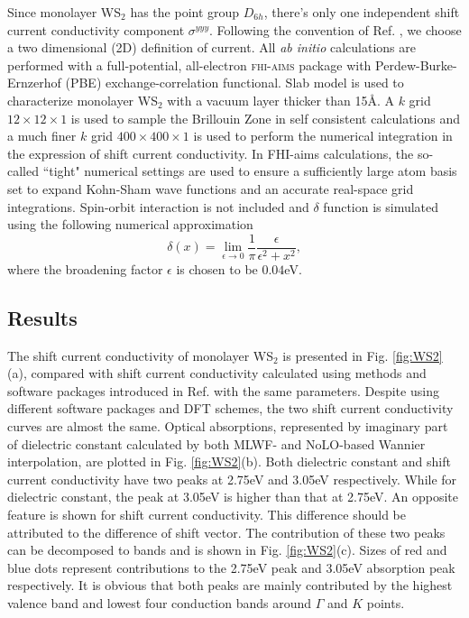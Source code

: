 Since monolayer WS$_2$ has the point group $D_{6h}$, there's only one independent shift current conductivity component $\sigma^{yyy}$\cite{bilbao,wang_first-principles_2017}. Following the convention of Ref. , we choose a two dimensional (2D) definition of current. All \emph{ab initio} calculations are performed with a full-potential, all-electron \textsc{fhi-aims} package\cite{blum_ab_2009} with Perdew-Burke-Ernzerhof (PBE) exchange-correlation functional\cite{perdew_generalized_1996}. Slab model is used to characterize monolayer WS$_2$ with a vacuum layer thicker than 15\AA. A $k$ grid $12\times12\times1$ is used to sample the Brillouin Zone in self consistent calculations and a much finer $k$ grid $400\times400\times1$ is used to perform the numerical integration in the expression of shift current conductivity. In FHI-aims calculations, the so-called ``tight" numerical settings are used to ensure a sufficiently large atom basis set to expand Kohn-Sham wave functions and an accurate real-space grid integrations\cite{blum_ab_2009}. Spin-orbit interaction is not included and $\delta$ function is simulated using the following numerical approximation 
\[
\delta(x)=\lim_{\epsilon\to0}\frac{1}{\pi}\frac{\epsilon}{\epsilon^2+x^2},
\]
where the broadening factor $\epsilon$ is chosen to be $0.04$eV.

\subsection{Results}

The shift current conductivity of monolayer WS$_2$ is presented in Fig. \ref{fig:WS2}(a), compared with shift current conductivity calculated using methods and software packages introduced in Ref.  with the same parameters. Despite using different software packages and DFT schemes, the two shift current conductivity curves are almost the same. Optical absorptions, represented by imaginary part of dielectric constant calculated by both MLWF- and NoLO-based Wannier interpolation, are plotted in Fig. \ref{fig:WS2}(b). Both dielectric constant and shift current conductivity have two peaks at 2.75eV and 3.05eV respectively. While for dielectric constant, the peak at 3.05eV is higher than that at 2.75eV. An opposite feature is shown for shift current conductivity. This difference should be attributed to the difference of shift vector. The contribution of these two peaks can be decomposed to bands and is shown in Fig. \ref{fig:WS2}(c). Sizes of red and blue dots represent contributions to the 2.75eV peak and 3.05eV absorption peak respectively. It is obvious that both peaks are mainly contributed by the highest valence band and lowest
four conduction bands around $\Gamma$ and $K$ points.

